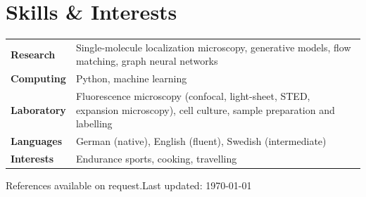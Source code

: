 \documentclass[10pt,a4paper]{article}
\begin{document}
\section{Skills \& Interests}
\begin{tabularx}{\textwidth}{@{}l X@{}}
  \textbf{Research}     & Single-molecule localization microscopy, generative models, flow matching, graph neural networks \\[1pt]
  \textbf{Computing}    & Python, machine learning \\[1pt]
  \textbf{Laboratory}   & Fluorescence microscopy (confocal, light-sheet, STED, expansion microscopy), cell culture, sample preparation and labelling \\[1pt]
  \textbf{Languages}    & German (native), English (fluent), Swedish (intermediate) \\[1pt]
  \textbf{Interests}    & Endurance sports, cooking, travelling \\
\end{tabularx}

\vspace{8pt}
{\small\color{muted}References available on request.\hfill Last updated: \today}
\end{document}
